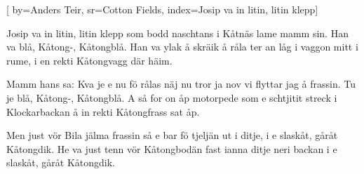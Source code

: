 

[ 		%
	by={Anders Teir},					%
	sr={Cotton Fields},					%
	index={Josip va in litin, litin klepp}]						%
	

\beginverse*						%
Josip va in litin, litin klepp som bodd
naschtans i Kåtnäs lame mamm sin.
Han va blå, Kåtong-, Kåtongblå.
Han va ylak å skräik å råla ter an låg
i vaggon mitt i rume,
i en rekti Kåtongvagg där häim.
\endverse							%

\beginverse*						%
Mamm hans sa: Kva je e nu fö rålas
näj nu tror ja nov vi flyttar jag å frassin.
Tu je blå, Kåtong-, Kåtongblå.
A så for on åp motorpede som e schtjitit
streck i Klockarbackan
å in rekti Kåtongfrass sat åp.
\endverse							%

\beginverse*						%
Men just vör Bila jälma frassin
så e bar fö tjeljän ut i ditje,
i e slaskåt, gåråt Kåtongdik.
He va just tenn vör Kåtongbodän
fast ianna ditje neri backan
i e slaskåt, gåråt Kåtongdik.
\endverse							%
\endsong							%


